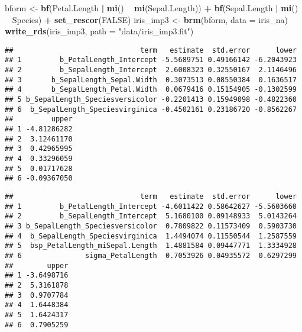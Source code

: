 \documentclass[]{article}
\newenvironment{Shaded}{\begin{snugshade}}{\end{snugshade}}
\newcommand{\KeywordTok}[1]{\textcolor[rgb]{0.13,0.29,0.53}{\textbf{#1}}}
\newcommand{\DataTypeTok}[1]{\textcolor[rgb]{0.13,0.29,0.53}{#1}}
\newcommand{\StringTok}[1]{\textcolor[rgb]{0.31,0.60,0.02}{#1}}
\newcommand{\OtherTok}[1]{\textcolor[rgb]{0.56,0.35,0.01}{#1}}
\newcommand{\OperatorTok}[1]{\textcolor[rgb]{0.81,0.36,0.00}{\textbf{#1}}}
\newcommand{\NormalTok}[1]{#1}
\begin{document}
\begin{Shaded}
\begin{Highlighting}[]
\NormalTok{bform <-}\StringTok{ }\KeywordTok{bf}\NormalTok{(Petal.Length }\OperatorTok{|}\StringTok{ }\KeywordTok{mi}\NormalTok{() }\OperatorTok{~}\StringTok{ }\KeywordTok{mi}\NormalTok{(Sepal.Length)) }\OperatorTok{+}\StringTok{ }
\StringTok{  }\KeywordTok{bf}\NormalTok{(Sepal.Length }\OperatorTok{|}\StringTok{ }\KeywordTok{mi}\NormalTok{() }\OperatorTok{~}\StringTok{ }\NormalTok{Species) }\OperatorTok{+}\StringTok{ }\KeywordTok{set_rescor}\NormalTok{(}\OtherTok{FALSE}\NormalTok{)}
\NormalTok{iris_imp3 <-}\StringTok{ }\KeywordTok{brm}\NormalTok{(bform, }\DataTypeTok{data =}\NormalTok{ iris_na)}
\KeywordTok{write_rds}\NormalTok{(iris_imp3, }\DataTypeTok{path =} \StringTok{"data/iris_imp3.fit"}\NormalTok{)}
\end{Highlighting}
\end{Shaded}

\begin{Shaded}
\end{Shaded}

\begin{verbatim}
##                              term   estimate  std.error      lower
## 1         b_PetalLength_Intercept -5.5689751 0.49166142 -6.2043923
## 2         b_SepalLength_Intercept  2.6008323 0.32550167  2.1146496
## 3       b_SepalLength_Sepal.Width  0.3073513 0.08550384  0.1636517
## 4       b_SepalLength_Petal.Width  0.0679416 0.15154905 -0.1302599
## 5 b_SepalLength_Speciesversicolor -0.2201413 0.15949098 -0.4822360
## 6  b_SepalLength_Speciesvirginica -0.4502161 0.23186720 -0.8562267
##         upper
## 1 -4.81286282
## 2  3.12461170
## 3  0.42965995
## 4  0.33296059
## 5  0.01717628
## 6 -0.09367050
\end{verbatim}

\begin{Shaded}
\end{Shaded}

\begin{verbatim}
##                              term   estimate  std.error      lower
## 1         b_PetalLength_Intercept -4.6011422 0.58642627 -5.5603660
## 2         b_SepalLength_Intercept  5.1680100 0.09148933  5.0143264
## 3 b_SepalLength_Speciesversicolor  0.7809822 0.11573409  0.5903730
## 4  b_SepalLength_Speciesvirginica  1.4494074 0.11550544  1.2587559
## 5  bsp_PetalLength_miSepal.Length  1.4881584 0.09447771  1.3334928
## 6               sigma_PetalLength  0.7053926 0.04935572  0.6297299
##        upper
## 1 -3.6498716
## 2  5.3161878
## 3  0.9707784
## 4  1.6448384
## 5  1.6424317
## 6  0.7905259
\end{verbatim}
\end{document}
